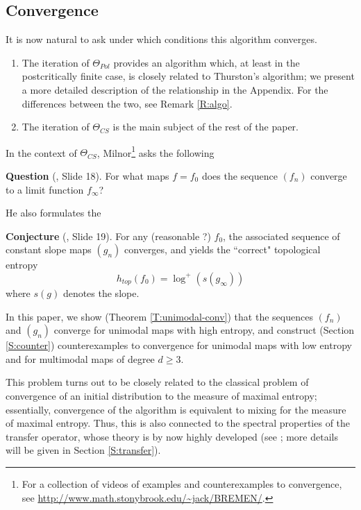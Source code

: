 \documentclass[11pt]{amsart}
\begin{document}
\subsection{Convergence} It is now natural to ask under which conditions this algorithm converges. 

\begin{enumerate}

\item The iteration of $\Theta_{Pol}$ provides an algorithm which, at least in the postcritically finite case, 
is closely related to Thurston's algorithm; we present a more detailed description of the relationship in the Appendix. 
For the differences between the two, see Remark \ref{R:algo}.

\item The iteration of $\Theta_{CS}$ is the main subject of the rest of the paper.

\end{enumerate}

\medskip

\noindent In the context of $\Theta_{CS}$, Milnor\footnote{For a collection of videos of examples and counterexamples to convergence, 
see \url{http://www.math.stonybrook.edu/~jack/BREMEN/}.} asks the following 
\smallskip

\noindent \textbf{Question }(\cite{Mil-slides}, Slide 18). 
For what maps $f = f_0$ does the sequence $(f_n)$ converge to a limit function $f_\infty$?

\medskip \noindent He also formulates the 
\smallskip 

\noindent \textbf{Conjecture }(\cite{Mil-slides}, Slide 19). For any (reasonable ?) $f_0$, the associated
sequence of constant slope maps $(g_n)$ converges, and yields
the ``correct" topological entropy 
$$h_{top}(f_0) = \log^+ (s(g_\infty))$$
where $s(g)$ denotes the slope. 

\medskip
\noindent In this paper, we show (Theorem \ref{T:unimodal-conv}) that the sequences $(f_n)$ and $(g_n)$ converge for unimodal maps with high entropy, and construct (Section \ref{S:counter}) counterexamples to convergence for unimodal maps with low entropy and for multimodal maps 
of degree $d \geq 3$. 

This problem turns out to be closely related to the classical problem of convergence of an initial distribution to the measure of maximal 
entropy; essentially, convergence of the algorithm is equivalent to mixing for the measure of maximal entropy. 
Thus, this is also connected to the spectral properties of the transfer operator, whose theory is by now highly developed (see \cite{Baladi-notes}; 
more details will be given in Section \ref{S:transfer}). 
\end{document}
